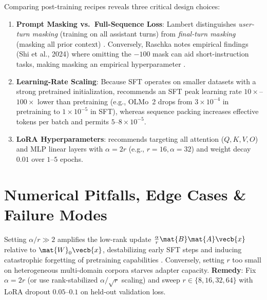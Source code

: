 \documentclass[../../../../master.tex]{subfiles}
\begin{document}
\begin{crossbook}
Comparing post-training recipes reveals three critical design choices:
\begin{enumerate}
  \item \textbf{Prompt Masking vs.\ Full-Sequence Loss}: Lambert distinguishes \emph{user-turn masking} (training on all assistant turns) from \emph{final-turn masking} (masking all prior context) . Conversely, Raschka notes empirical findings (Shi et al., 2024) where omitting the $-100$ mask can aid short-instruction tasks, making masking an empirical hyperparameter .
  \item \textbf{Learning-Rate Scaling}: Because SFT operates on smaller datasets with a strong pretrained initialization,  recommends an SFT peak learning rate $10\times$--$100\times$ lower than pretraining (e.g., OLMo~2 drops from $3\times 10^{-4}$ in pretraining to $1\times 10^{-5}$ in SFT), whereas sequence packing increases effective tokens per batch and permits $5\text{--}8\times 10^{-5}$.
  \item \textbf{LoRA Hyperparameters}:  recommends targeting all attention ($Q, K, V, O$) and MLP linear layers with $\alpha = 2r$ (e.g., $r=16, \alpha=32$) and weight decay $0.01$ over $1\text{--}5$ epochs.
\end{enumerate}
\end{crossbook}

\section{Numerical Pitfalls, Edge Cases \& Failure Modes}
\label{sec:pretrain:pitfalls}

\begin{pitfall}
Setting $\alpha/r \gg 2$ amplifies the low-rank update $\frac{\alpha}{r}\mat{B}\mat{A}\vecb{x}$ relative to $\mat{W}_0\vecb{x}$, destabilizing early SFT steps and inducing catastrophic forgetting of pretraining capabilities . Conversely, setting $r$ too small on heterogeneous multi-domain corpora starves adapter capacity. \textbf{Remedy}: Fix $\alpha = 2r$ (or use rank-stabilized $\alpha/\sqrt{r}$ scaling) and sweep $r \in \{8, 16, 32, 64\}$ with LoRA dropout $0.05$--$0.1$ on held-out validation loss.
\end{pitfall}
\end{document}
